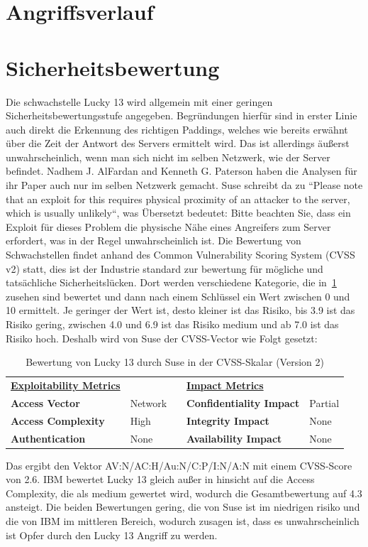 \documentclass[a4paper,10pt]{scrartcl}
\begin{document}
    \section{Angriffsverlauf}\label{sec:angriffsverlauf}


    \section{Sicherheitsbewertung}\label{sec:sicherheitsbewertung}
    Die schwachstelle Lucky 13 wird allgemein mit einer geringen Sicherheitsbewertungsstufe angegeben.
    Begründungen hierfür sind in erster Linie auch direkt die Erkennung des richtigen Paddings, welches wie bereits erwähnt über die Zeit der Antwort des Servers ermittelt wird.
    Das ist allerdings äußerst unwahrscheinlich, wenn man sich nicht im selben Netzwerk, wie der Server befindet.
    Nadhem J. AlFardan and Kenneth G. Paterson haben die Analysen für ihr Paper auch nur im selben Netzwerk gemacht.
    Suse schreibt da zu ``Please note that an exploit for this requires physical proximity of an attacker to the server, which is usually unlikely``, was Übersetzt bedeutet: Bitte beachten Sie, dass ein Exploit für dieses Problem die physische Nähe eines Angreifers zum Server erfordert, was in der Regel unwahrscheinlich ist.
    Die Bewertung von Schwachstellen findet anhand des Common Vulnerability Scoring System (CVSS v2) statt, dies ist der Industrie standard zur bewertung für mögliche und tatsächliche Sicherheitslücken.
    Dort werden verschiedene Kategorie, die in~\ref{tab:CVSS-Vektor} zusehen sind bewertet und dann nach einem Schlüssel ein Wert zwischen 0 und 10 ermittelt.
    Je geringer der Wert ist, desto kleiner ist das Risiko, bis 3.9 ist das Risiko gering, zwischen 4.0 und 6.9 ist das Risiko medium und ab 7.0 ist das Risiko hoch.
    Deshalb wird von Suse der CVSS-Vector wie Folgt gesetzt:
    \begin{table}[h]
        \begin{tabular}{lllll}
        {\ul \textbf{Exploitability Metrics}}
            &         & & {\ul \textbf{Impact Metrics}}   & \multicolumn{1}{c}{} \\
            \textbf{Access Vector}     & Network & & \textbf{Confidentiality Impact} & Partial              \\
            \textbf{Access Complexity} & High    & & \textbf{Integrity Impact}       & None                 \\
            \textbf{Authentication}    & None    & & \textbf{Availability Impact}    & None
        \end{tabular}\caption{Bewertung von Lucky 13 durch Suse in der CVSS-Skalar (Version 2)}\label{tab:CVSS-Vektor}
    \end{table}
    \newline
    Das ergibt den Vektor AV:N/AC:H/Au:N/C:P/I:N/A:N mit einem CVSS-Score von 2.6.
    IBM bewertet Lucky 13 gleich außer in hinsicht auf die Access Complexity, die als medium gewertet wird, wodurch die Gesamtbewertung auf 4.3 ansteigt.
    Die beiden Bewertungen gering, die von Suse ist im niedrigen risiko und die von IBM im mittleren Bereich, wodurch zusagen ist, dass es unwahrscheinlich ist Opfer durch den Lucky 13 Angriff zu werden.
\end{document}
